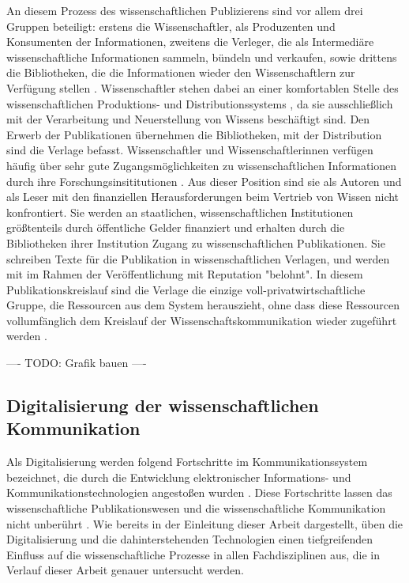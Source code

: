 An diesem Prozess des wissenschaftlichen Publizierens sind vor allem drei Gruppen beteiligt: erstens die Wissenschaftler, als Produzenten und Konsumenten der Informationen, zweitens die Verleger, die als Intermediäre wissenschaftliche Informationen sammeln, bündeln und verkaufen, sowie drittens die Bibliotheken, die die Informationen wieder den Wissenschaftlern zur Verfügung stellen \cite{Odlyzko_1997}. Wissenschaftler stehen dabei an einer komfortablen Stelle des wissenschaftlichen Produktions- und Distributionssystems \cite{herb_2010}, da sie ausschließlich mit der Verarbeitung und Neuerstellung von Wissens beschäftigt sind. Den Erwerb der Publikationen übernehmen die Bibliotheken, mit der Distribution sind die Verlage befasst. Wissenschaftler und Wissenschaftlerinnen verfügen häufig über sehr gute Zugangsmöglichkeiten zu wissenschaftlichen Informationen durch ihre Forschungsinsititutionen \cite{cope2014future}. Aus dieser Position sind sie als Autoren und als Leser mit den finanziellen Herausforderungen beim Vertrieb von Wissen nicht konfrontiert. Sie werden an staatlichen, wissenschaftlichen Institutionen größtenteils durch öffentliche Gelder finanziert und erhalten durch die Bibliotheken ihrer Institution Zugang zu wissenschaftlichen Publikationen. Sie schreiben Texte für die Publikation in wissenschaftlichen Verlagen, und werden mit im Rahmen der Veröffentlichung mit Reputation "belohnt". In diesem Publikationskreislauf sind die Verlage die einzige voll-privatwirtschaftliche Gruppe, die Ressourcen aus dem System herauszieht, ohne dass diese Ressourcen vollumfänglich dem Kreislauf der Wissenschaftskommunikation wieder zugeführt werden \cite{kiley_2006_open}.

---- TODO: Grafik bauen ----

\subsection{Digitalisierung der wissenschaftlichen Kommunikation}

Als Digitalisierung werden folgend Fortschritte im Kommunikationssystem bezeichnet, die durch die Entwicklung elektronischer Informations- und Kommunikationstechnologien angestoßen wurden \cite{bbaw_publizieren_2015}. Diese Fortschritte lassen das wissenschaftliche Publikationswesen und die wissenschaftliche Kommunikation nicht unberührt \cite{naeder_2010_open}. Wie bereits in der Einleitung dieser Arbeit dargestellt, üben die Digitalisierung und die dahinterstehenden Technologien einen tiefgreifenden Einfluss auf die wissenschaftliche Prozesse in allen Fachdisziplinen aus, die in Verlauf dieser Arbeit genauer untersucht werden.

